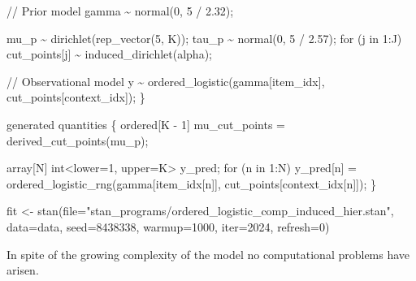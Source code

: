 \documentclass[
  letterpaper,
  DIV=11,
  numbers=noendperiod]{scrartcl}
\newenvironment{Shaded}{\begin{snugshade}}{\end{snugshade}}
\newcommand{\AttributeTok}[1]{\textcolor[rgb]{0.40,0.45,0.13}{#1}}
\newcommand{\CommentTok}[1]{\textcolor[rgb]{0.37,0.37,0.37}{#1}}
\newcommand{\ControlFlowTok}[1]{\textcolor[rgb]{0.00,0.23,0.31}{#1}}
\newcommand{\DataTypeTok}[1]{\textcolor[rgb]{0.68,0.00,0.00}{#1}}
\newcommand{\DecValTok}[1]{\textcolor[rgb]{0.68,0.00,0.00}{#1}}
\newcommand{\FloatTok}[1]{\textcolor[rgb]{0.68,0.00,0.00}{#1}}
\newcommand{\FunctionTok}[1]{\textcolor[rgb]{0.28,0.35,0.67}{#1}}
\newcommand{\KeywordTok}[1]{\textcolor[rgb]{0.00,0.23,0.31}{#1}}
\newcommand{\NormalTok}[1]{\textcolor[rgb]{0.00,0.23,0.31}{#1}}
\newcommand{\OtherTok}[1]{\textcolor[rgb]{0.00,0.23,0.31}{#1}}
\newcommand{\SpecialCharTok}[1]{\textcolor[rgb]{0.37,0.37,0.37}{#1}}
\newcommand{\StringTok}[1]{\textcolor[rgb]{0.13,0.47,0.30}{#1}}
\begin{document}
\begin{codelisting}
\begin{Shaded}
\begin{Highlighting}[]
  \CommentTok{// Prior model}
\NormalTok{  gamma \textasciitilde{} normal(}\DecValTok{0}\NormalTok{, }\DecValTok{5}\NormalTok{ / }\FloatTok{2.32}\NormalTok{);}

\NormalTok{  mu\_p \textasciitilde{} dirichlet(rep\_vector(}\DecValTok{5}\NormalTok{, K));}
\NormalTok{  tau\_p \textasciitilde{} normal(}\DecValTok{0}\NormalTok{, }\DecValTok{5}\NormalTok{ / }\FloatTok{2.57}\NormalTok{);}
  \ControlFlowTok{for}\NormalTok{ (j }\ControlFlowTok{in} \DecValTok{1}\NormalTok{:J)}
\NormalTok{    cut\_points[j] \textasciitilde{} induced\_dirichlet(alpha);}

  \CommentTok{// Observational model}
\NormalTok{  y \textasciitilde{} ordered\_logistic(gamma[item\_idx], cut\_points[context\_idx]);}
\NormalTok{\}}

\KeywordTok{generated quantities}\NormalTok{ \{}
  \DataTypeTok{ordered}\NormalTok{[K {-} }\DecValTok{1}\NormalTok{] mu\_cut\_points = derived\_cut\_points(mu\_p);}

  \DataTypeTok{array}\NormalTok{[N] }\DataTypeTok{int}\NormalTok{\textless{}}\KeywordTok{lower}\NormalTok{=}\DecValTok{1}\NormalTok{, }\KeywordTok{upper}\NormalTok{=K\textgreater{} y\_pred;}
  \ControlFlowTok{for}\NormalTok{ (n }\ControlFlowTok{in} \DecValTok{1}\NormalTok{:N)}
\NormalTok{    y\_pred[n] = ordered\_logistic\_rng(gamma[item\_idx[n]],}
\NormalTok{                                     cut\_points[context\_idx[n]]);}
\NormalTok{\}}
\end{Highlighting}
\end{Shaded}

\end{codelisting}

\begin{Shaded}
\begin{Highlighting}[]
\NormalTok{fit }\OtherTok{\textless{}{-}} \FunctionTok{stan}\NormalTok{(}\AttributeTok{file=}\StringTok{"stan\_programs/ordered\_logistic\_comp\_induced\_hier.stan"}\NormalTok{,}
            \AttributeTok{data=}\NormalTok{data, }\AttributeTok{seed=}\DecValTok{8438338}\NormalTok{,}
            \AttributeTok{warmup=}\DecValTok{1000}\NormalTok{, }\AttributeTok{iter=}\DecValTok{2024}\NormalTok{, }\AttributeTok{refresh=}\DecValTok{0}\NormalTok{)}
\end{Highlighting}
\end{Shaded}

In spite of the growing complexity of the model no computational
problems have arisen.

\begin{Shaded}
\end{Shaded}
\end{document}
